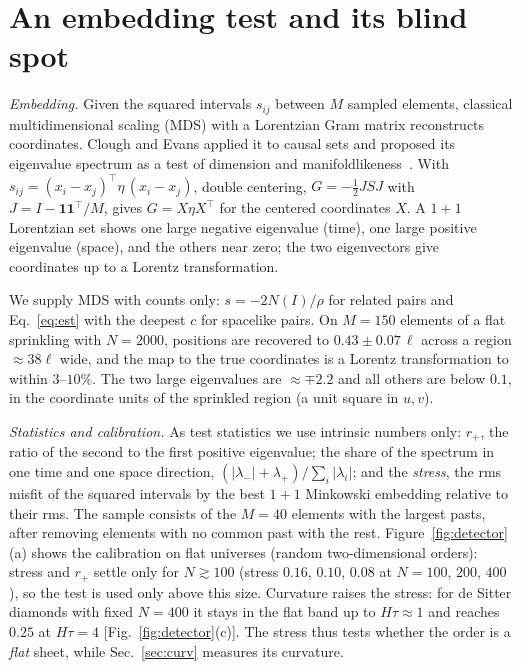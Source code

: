\documentclass[prd,twocolumn,superscriptaddress,nofootinbib,amsmath,amssymb,floatfix]{revtex4-2}
\begin{document}
\section{An embedding test and its blind spot}\label{sec:embed}
\emph{Embedding.} Given the squared intervals $s_{ij}$ between $M$ sampled elements, classical multidimensional scaling (MDS) with a Lorentzian Gram matrix reconstructs coordinates. Clough and Evans applied it to causal sets and proposed its eigenvalue spectrum as a test of dimension and manifoldlikeness~\cite{CloughEvans16,Clough17}. With $s_{ij}=(x_i-x_j)^{\top}\eta\,(x_i-x_j)$, double centering, $G=-\tfrac12JSJ$ with $J=I-\mathbf1\mathbf1^{\top}/M$, gives $G=X\eta X^{\top}$ for the centered coordinates $X$. A $1+1$ Lorentzian set shows one large negative eigenvalue (time), one large positive eigenvalue (space), and the others near zero; the two eigenvectors give coordinates up to a Lorentz transformation.

We supply MDS with counts only: $s=-2N(I)/\rho$ for related pairs and Eq.~\eqref{eq:est} with the deepest $c$ for spacelike pairs. On $M=150$ elements of a flat sprinkling with $N=2000$, positions are recovered to $0.43\pm0.07\,\ell$ across a region $\approx38\ell$ wide, and the map to the true coordinates is a Lorentz transformation to within $3$--$10\%$. The two large eigenvalues are $\approx\mp2.2$ and all others are below $0.1$, in the coordinate units of the sprinkled region (a unit square in $u,v$).

\emph{Statistics and calibration.} As test statistics we use intrinsic numbers only: $r_+$, the ratio of the second to the first positive eigenvalue; the share of the spectrum in one time and one space direction, $(|\lambda_-|+\lambda_+)/\sum_i|\lambda_i|$; and the \emph{stress}, the rms misfit of the squared intervals by the best $1+1$ Minkowski embedding relative to their rms. The sample consists of the $M=40$ elements with the largest pasts, after removing elements with no common past with the rest. Figure~\ref{fig:detector}(a) shows the calibration on flat universes (random two-dimensional orders): stress and $r_+$ settle only for $N\gtrsim100$ (stress $0.16$, $0.10$, $0.08$ at $N=100$, $200$, $400$), so the test is used only above this size. Curvature raises the stress: for de Sitter diamonds with fixed $N=400$ it stays in the flat band up to $H\tau\approx1$ and reaches $0.25$ at $H\tau=4$ [Fig.~\ref{fig:detector}(c)]. The stress thus tests whether the order is a \emph{flat} sheet, while Sec.~\ref{sec:curv} measures its curvature.
\end{document}
